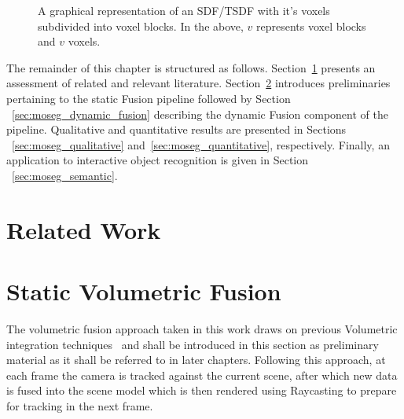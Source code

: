 \begin{figure}[h]
{
  }
  \caption[TSDF split in to voxel blocks]{A graphical representation of an 
  SDF/TSDF with it's voxels subdivided into voxel blocks. In the above, \(v\) 
  represents voxel blocks and \(v\) voxels.}
\end{figure}

The remainder of this chapter is structured as follows.
Section~\ref{sec:moseg_related_work} presents an assessment of related and
relevant literature. Section~\ref{sec:moseg_static_fusion} introduces
preliminaries pertaining to the static Fusion pipeline followed by Section
~\ref{sec:moseg_dynamic_fusion} describing the dynamic Fusion component of the
pipeline. Qualitative and quantitative results are presented in Sections
~\ref{sec:moseg_qualitative} and~\ref{sec:moseg_quantitative}, respectively.
Finally, an application to interactive object recognition is given in Section
~\ref{sec:moseg_semantic}.

\section{Related Work}
\label{sec:moseg_related_work}

\section{Static Volumetric Fusion}
\label{sec:moseg_static_fusion}
The volumetric fusion approach taken in this work draws on previous Volumetric
integration techniques~\cite{Curless1996, Newcombe2011, NieBner2013, Prisacariu2014} 
and shall be introduced in this section as preliminary material as it shall be
referred to in later chapters. Following this approach, at each frame the camera
is tracked against the current scene, after which new data is fused into the
scene model which is then rendered using Raycasting to prepare for tracking in
the next frame.

